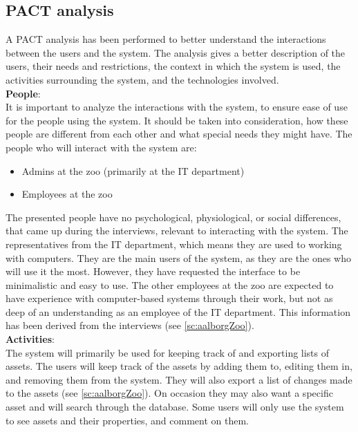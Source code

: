 \subsection{PACT analysis}\label{ssc:PACT}
A PACT analysis \cite[chap 2]{DEB} has been performed to better understand the interactions between the users and the system. The analysis gives a better description of the users, their needs and restrictions, the context in which the system is used, the activities surrounding the system, and the technologies involved.\\

\textbf{People}:\\
It is important to analyze the interactions with the system, to ensure ease of use for the people using the system. It should be taken into consideration, how these people are different from each other and what special needs they might have. The people who will interact with the system are:

\begin{itemize}
    \setlength\itemsep{0.05em}
    \item Admins at the zoo (primarily at the IT department)
    \item Employees at the zoo
\end{itemize}

The presented people have no psychological, physiological, or social differences, that came up during the interviews, relevant to interacting with the system. The representatives from the IT department, which means they are used to working with computers. They are the main users of the system, as they are the ones who will use it the most. However, they have requested the interface to be minimalistic and easy to use. The other employees at the zoo are expected to have experience with computer-based systems through their work, but not as deep of an understanding as an employee of the IT department. This information has been derived from the interviews (see \autoref{sc:aalborgZoo}).\\

\textbf{Activities}: \\
The system will primarily be used for keeping track of and exporting lists of assets. The users will keep track of the assets by adding them to, editing them in, and removing them from the system. They will also export a list of changes made to the assets (see \autoref{sc:aalborgZoo}). On occasion they may also want a specific asset and will search through the database. Some users will only use the system to see assets and their properties, and comment on them.\\

